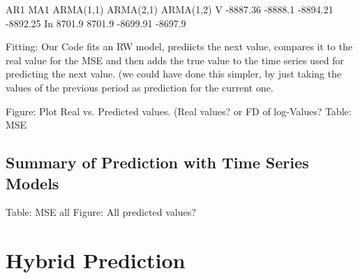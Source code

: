 \begin{figure}[h]
    \centering
    \begin{adjustbox}{width=.95\textwidth,center}
    
    \end{adjustbox}
    \begin{adjustbox}{width=.95\textwidth,center}
    
    \end{adjustbox} 
    \caption{}
    \label{fig:INTC_V_ACF_log_returns}
\end{figure}{}

    AR1         MA1         ARMA(1,1)   ARMA(2,1)   ARMA(1,2)     
V   -8887.36    -8888.1     -8894.21    -8892.25 
In  8701.9      8701.9      -8699.91    -8697.9

Fitting: 
Our Code fits an RW model, prediicts the next value, compares it to the real value for the MSE and then adds the true value to the time series used for predicting the next value. (we could have done this simpler, by just taking the values of the previous period as prediction for the current one. 

Figure: Plot Real vs. Predicted values. (Real values? or FD of log-Values?
Table: MSE





\subsection{Summary of Prediction with Time Series Models}
Table: MSE all
Figure: All predicted values?


\section{Hybrid Prediction}

